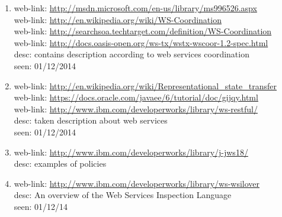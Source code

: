 \begin{enumerate}
\item \label{Web Services Coordination} web-link: \url{http://msdn.microsoft.com/en-us/library/ms996526.aspx}  \\
web-link: \url{http://en.wikipedia.org/wiki/WS-Coordination}  \\
web-link: \url{http://searchsoa.techtarget.com/definition/WS-Coordination}  \\ 
web-link: \url{http://docs.oasis-open.org/ws-tx/wstx-wscoor-1.2-spec.html}  \\ desc: contains description according to web services coordination  \\ seen: 01/12/2014  \\
\item \label{RESTful Web Services} web-link: \url{http://en.wikipedia.org/wiki/Representational_state_transfer}  \\
web-link: \url{https://docs.oracle.com/javaee/6/tutorial/doc/gijqy.html}  \\ 
web-link: \url{http://www.ibm.com/developerworks/library/ws-restful/}  \\ desc: taken description about web services  \\ seen: 01/12/2014 \\
\item \label{ws-policy} web-link: 
\url{http://www.ibm.com/developerworks/library/j-jws18/}  \\ desc: examples of policies
\item \label{ws-disc} web-link: \url{http://www.ibm.com/developerworks/library/ws-wsilover} \\ desc: An overview of the Web Services Inspection Language\\ seen: 01/12/14
\end{enumerate}

